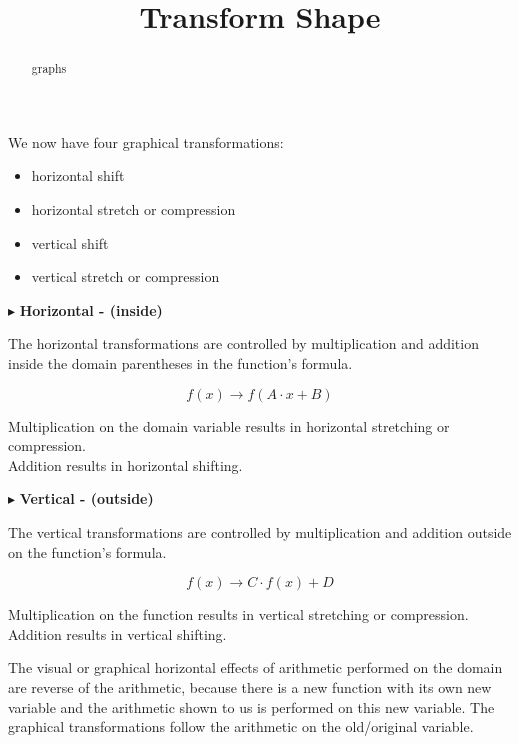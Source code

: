 \documentclass{ximera}
\title{Transform Shape}
\begin{document}
\begin{abstract}
graphs
\end{abstract}
\maketitle



We now have four graphical transformations:


\begin{itemize}
\item horizontal shift
\item horizontal stretch or compression
\item vertical shift
\item vertical stretch or compression
\end{itemize}






$\blacktriangleright$  \textbf{\textcolor{purple!85!blue}{Horizontal - (inside)}}  


The horizontal transformations are controlled by multiplication and addition inside the domain parentheses in the function's formula.

\[      f(x) \longrightarrow   f(A \cdot x + B)  \]

Multiplication on the domain variable results in horizontal stretching or compression. \\
Addition results in horizontal shifting. 





$\blacktriangleright$   \textbf{\textcolor{purple!85!blue}{Vertical - (outside)}}  



The vertical transformations are controlled by multiplication and addition outside on the function's formula.

\[      f(x) \longrightarrow   C \cdot f(x) + D \]

Multiplication on the function results in vertical stretching or compression. \\
Addition results in vertical shifting. 





The visual or graphical horizontal effects of arithmetic performed on the domain are reverse of the arithmetic, because  there is a new function with its own new variable and the arithmetic shown to us is performed on this new variable.  The graphical transformations follow the arithmetic on the old/original variable.
\end{document}
